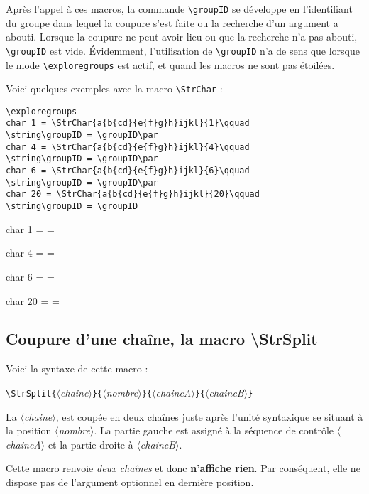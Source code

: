 \documentclass[a4paper,10pt]{article}
\newcommand\argu[1]{$\langle$\textit{#1}$\rangle$}
\newcommand\ARGU[1]{\texttt{\color{black}\{}\argu{#1}\texttt{\color{black}\}}}
\newcommand\US{unité syntaxique\xspace}
\newcommand\styleexercice{\footnotesize}
\newcommand\verbinline{\lstinline[basicstyle=\normalsize\ttfamily]}
\begin{document}
Après l'appel à ces macros, la commande \verbinline|\groupID| se développe en l'identifiant du groupe dans lequel la coupure s'est faite ou la recherche d'un argument a abouti. Lorsque la coupure ne peut avoir lieu ou que la recherche n'a pas abouti, \verbinline|\groupID| est vide. Évidemment, l'utilisation de \verbinline|\groupID| n'a de sens que lorsque le mode \verbinline|\exploregroups| est actif, et quand les macros ne sont pas étoilées.\smallskip

Voici quelques exemples avec la macro \verbinline|\StrChar| :\par\nobreak\smallskip
\begin{minipage}[c]{0.65\linewidth}
\begin{lstlisting}
\exploregroups
char 1 = \StrChar{a{b{cd}{e{f}g}h}ijkl}{1}\qquad
\string\groupID = \groupID\par
char 4 = \StrChar{a{b{cd}{e{f}g}h}ijkl}{4}\qquad
\string\groupID = \groupID\par
char 6 = \StrChar{a{b{cd}{e{f}g}h}ijkl}{6}\qquad
\string\groupID = \groupID\par
char 20 = \StrChar{a{b{cd}{e{f}g}h}ijkl}{20}\qquad
\string\groupID = \groupID
\end{lstlisting}%
\end{minipage}\hfill
\begin{minipage}[c]{0.35\linewidth}
	\styleexercice
	\exploregroups
	char 1 = \qquad
	\string\groupID = \groupID\par
	char 4 = \qquad
	\string\groupID = \groupID\par
	char 6 = \qquad
	\string\groupID = \groupID\par
	char 20 = \qquad
	\string\groupID = \groupID
\end{minipage}

\subsection{Coupure d'une chaîne, la macro {\ttfamily\textbackslash StrSplit}}
\label{StrSplit}
Voici la syntaxe de cette macro :\par\nobreak\smallskip
\verbinline|\StrSplit|\ARGU{chaine}\ARGU{nombre}\ARGU{chaineA}\ARGU{chaineB}
\smallskip

La \argu{chaine}, est coupée en deux chaînes juste après l'\US se situant à la position \argu{nombre}. La partie gauche est assigné à la séquence de contrôle \argu{chaineA} et la partie droite à \argu{chaineB}.\par
Cette macro renvoie \emph{deux chaînes} et donc \textbf{n'affiche rien}. Par conséquent, elle ne dispose pas de l'argument optionnel en dernière position.\medskip
\end{document}
